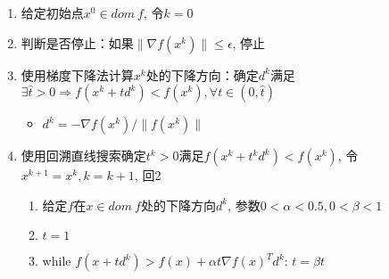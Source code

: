 \documentclass[12pt,a4paper,UTF-8]{article}
\begin{document}
\begin{enumerate}

	\item 给定初始点$x^0 \in dom\ f$, 令$k=0$ 

	\item 判断是否停止：如果$\lVert \nabla f(x^k) \rVert \leq \epsilon$, 停止 

	\item 使用梯度下降法计算$x^k$处的下降方向：确定$d^k$满足$\exists \hat{t} > 0 \Rightarrow f(x^k + t d^k) < f(x^k), \forall t \in (0, \hat{t})$

	\begin{itemize}

		\item[] $d^k = -\nabla f(x^k) / \lVert f(x^k) \rVert$

	\end{itemize}

	\item 使用回溯直线搜索确定$t^k > 0$满足$f(x^k + t^k d^k) < f(x^k)$, 令$x^{k+1} = x^k, k = k + 1$, 回2

	\begin{enumerate}[(1)]

		\item 给定$f$在$x \in dom\ f$处的下降方向$d^k$, 参数$0 < \alpha < 0.5, 0 < \beta < 1$

		\item $t = 1$

		\item while $f(x + t d^k) > f(x) + \alpha t \nabla f(x)^T d^k$: $t = \beta t$ 

	\end{enumerate}

\end{enumerate}

\newpage
\end{document}
